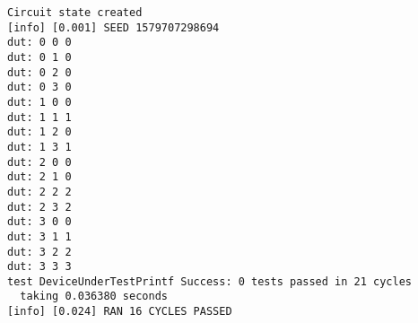 \documentclass[%
    10pt,
    headinclude, footexclude,
    openright, %
    notitlepage,
    cleardoubleempty,
    headsepline,
    pointlessnumbers,
    bibtotoc, idxtotoc,
    ]{scrbook}
\newif\ifshoworiginal
\newif\ifshowtrans
\newcommand{\todo}[1]{{\emph{TODO: #1}}}
\newcommand{\myref}[2]{\href{#1}{#2}}
\renewcommand{\myref}[2]{{#2}{\footnote{\url{#1}}}}
\renewcommand{\todo}[1]{}
\begin{document}
\begin{flushleft}
\ifshoworiginal
\noindent When testing this module with the counter based tester, which iterates over all possible
values, we get following output, verifying that the AND function is correct:
\fi

\ifshowtrans %
\noindent すべての可能な値を繰り返し処理するカウンタベースのテスタを使ってこのモジュールをテストすると、以下のような出力が得られます。AND関数が正しいことが確認できます。
\fi

\begin{lstlisting}
Circuit state created
[info] [0.001] SEED 1579707298694
dut: 0 0 0
dut: 0 1 0
dut: 0 2 0
dut: 0 3 0
dut: 1 0 0
dut: 1 1 1
dut: 1 2 0
dut: 1 3 1
dut: 2 0 0
dut: 2 1 0
dut: 2 2 2
dut: 2 3 2
dut: 3 0 0
dut: 3 1 1
dut: 3 2 2
dut: 3 3 3
test DeviceUnderTestPrintf Success: 0 tests passed in 21 cycles
  taking 0.036380 seconds
[info] [0.024] RAN 16 CYCLES PASSED
\end{lstlisting}

\ifshoworiginal
Chisel printf supports
\myref{https://github.com/freechipsproject/chisel3/wiki/Printing-in-Chisel}{C and Scala style formatting}.
\fi

\ifshowtrans %
Chiselのprintfは\myref{https://github.com/freechipsproject/chisel3/wiki/Printing-in-Chisel}{C and Scala style formatting}をサポートしています。
\fi

\ifshoworiginal
\section{Exercises}
\fi
\ifshowtrans %
\section{演習}
\fi

\ifshoworiginal
For this exercise, we will revisit the blinking LED from
\myref{https://github.com/schoeberl/chisel-examples}{chisel-examples}
and explore Chisel testing. \todo{Also use the ALU example.}
\fi

\ifshowtrans %
この演習では、\myref{https://github.com/schoeberl/chisel-examples}{chisel-examples}のLED点滅回路を使い、Chiselのテストを試します。
\fi

\ifshoworiginal
\subsection{A Minimal Project}
\fi
\ifshowtrans %
\subsection{最小のプロジェクト}
\fi


\end{flushleft}
\end{document}
